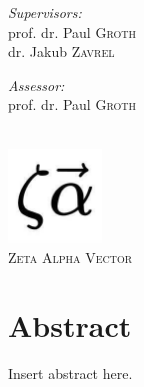 \documentclass[12pt]{report}
\begin{document}
\begin{titlepage}
\noindent
\begin{minipage}[t]{0.4\textwidth}
\begin{flushleft} \large
\emph{Supervisors:} \\
prof. dr. Paul \textsc{Groth}\\
dr. Jakub \textsc{Zavrel}
\end{flushleft}
\end{minipage}
\begin{minipage}[t]{0.4\textwidth}
\begin{flushright} \large
\emph{Assessor:} \\
prof. dr. Paul \textsc{Groth}\\
\end{flushright}
\end{minipage}\\[2cm]


\includegraphics[width=2.5cm]{assets/logos/zeta-alpha-logo.jpg}\\ %
\textsc{\large Zeta Alpha Vector}\\[1.0cm] %
 

\vfill %

\end{titlepage}

\chapter*{Abstract}

Insert abstract here.
\end{document}
